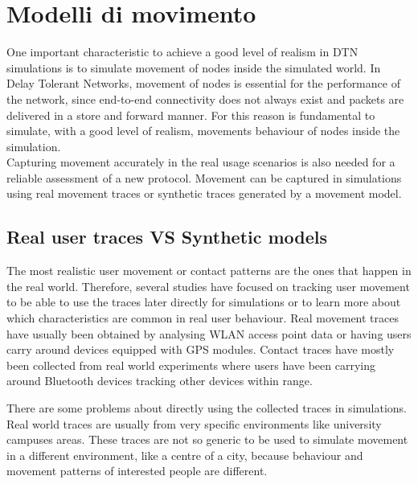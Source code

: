 
\chapter{Modelli di movimento}\label{movimento} %





One important characteristic to achieve a good level of realism in DTN simulations is to simulate movement of nodes inside the simulated world. In Delay Tolerant Networks, movement of nodes is essential for the performance of the network, since end-to-end connectivity does not always exist and packets are delivered in a store and forward manner. For this reason is fundamental to simulate, with a good level of realism, movements behaviour of nodes inside the simulation.
\\

Capturing movement accurately in the real usage scenarios is also needed for a reliable assessment of a new protocol. Movement can be captured in simulations using real movement traces or synthetic traces generated by a movement model.

\section{Real user traces VS Synthetic models}
The most realistic user movement or contact patterns are the ones that happen in the real world. Therefore, several studies have focused on tracking user movement to be able to use the traces later directly for simulations or to learn more about which characteristics are common in real user behaviour.
Real movement traces have usually been obtained by analysing WLAN access point data or
having users carry around devices equipped with GPS modules. Contact traces have
mostly been collected from real world experiments where users have been carrying
around Bluetooth devices tracking other devices within range.

There are some problems about directly using the collected traces in simulations. Real world traces are usually from very specific environments like university campuses areas. These traces are not so generic to be used to simulate movement in a different environment, like a centre of a city, because behaviour and movement patterns of interested people are different. \\

